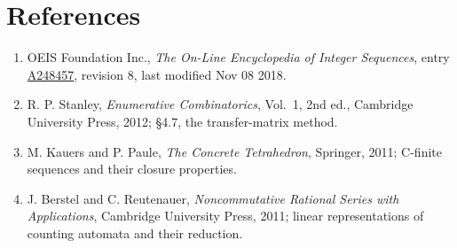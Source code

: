 \documentclass[11pt]{article}
\theoremstyle{definition}
\begin{document}
\section{References}

\begin{enumerate}

\item OEIS Foundation Inc., \emph{The On-Line Encyclopedia of Integer Sequences}, entry \href{https://oeis.org/A248457}{A248457}, revision 8, last modified Nov 08 2018.

\item R. P. Stanley, \emph{Enumerative Combinatorics}, Vol.~1, 2nd ed., Cambridge University Press, 2012; \S4.7, the transfer-matrix method.

\item M. Kauers and P. Paule, \emph{The Concrete Tetrahedron}, Springer, 2011; C-finite sequences and their closure properties.

\item J. Berstel and C. Reutenauer, \emph{Noncommutative Rational Series with Applications}, Cambridge University Press, 2011; linear representations of counting automata and their reduction.

\end{enumerate}
\end{document}

